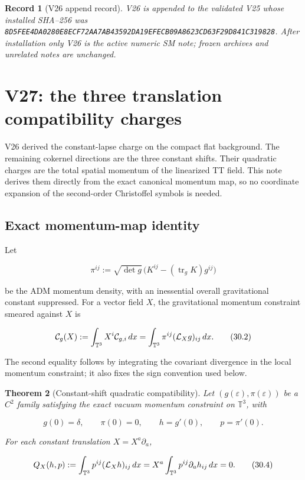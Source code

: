 \documentclass[11pt]{article}
\newtheorem{theorem}{Theorem}[section]
\newtheorem{record}[theorem]{Record}
\theoremstyle{remark}
\begin{document}
\begin{record}[V26 append record]
\label{rec:v19v26}
V26 is appended to the validated V25 whose installed SHA--256 was
\texttt{8D5FEE4DA0280E8ECF72AA7AB43592DA19EFECB09A8623CD63F29D841C319828}.
After installation only V26 is the active numeric SM note; frozen
archives and unrelated notes are unchanged.
\end{record}



\section{V27: the three translation compatibility charges}
\label{sec:v19v27}

V26 derived the constant-lapse charge on the compact flat background.
The remaining cokernel directions are the three constant shifts.  Their
quadratic charges are the total spatial momentum of the linearized TT
field.  This note derives them directly from the exact canonical momentum
map, so no coordinate expansion of the second-order Christoffel symbols
is needed.

\subsection{Exact momentum-map identity}

Let

\[
 \pi^{ij}:=\sqrt{\det g}\,
 \bigl(K^{ij}-(\operatorname{tr}_gK)g^{ij}\bigr)               \tag{30.1}
\]

be the ADM momentum density, with an inessential overall gravitational
constant suppressed.  For a vector field \(X\), the gravitational
momentum constraint smeared against \(X\) is

\[
 {\cal C}_g(X)
 :=\int_{\mathbb T^3}X^i{\cal C}_{g,i}\,dx
 =\int_{\mathbb T^3}\pi^{ij}({\cal L}_Xg)_{ij}\,dx.            \tag{30.2}
\]

The second equality follows by integrating the covariant divergence in
the local momentum constraint; it also fixes the sign convention used
below.

\begin{theorem}[Constant-shift quadratic compatibility]
\label{thm:v19v27-shift}
Let \((g(\varepsilon),\pi(\varepsilon))\) be a \(C^2\) family satisfying
the exact vacuum momentum constraint on \(\mathbb T^3\), with

\[
 g(0)=\delta,\qquad \pi(0)=0,\qquad
 h=g'(0),\qquad p=\pi'(0).                                    \tag{30.3}
\]

For each constant translation \(X=X^a\partial_a\),

\[
 Q_X(h,p):=\int_{\mathbb T^3}p^{ij}({\cal L}_Xh)_{ij}\,dx
 =X^a\int_{\mathbb T^3}p^{ij}\partial_a h_{ij}\,dx=0.         \tag{30.4}
\]
\end{theorem}
\end{document}
